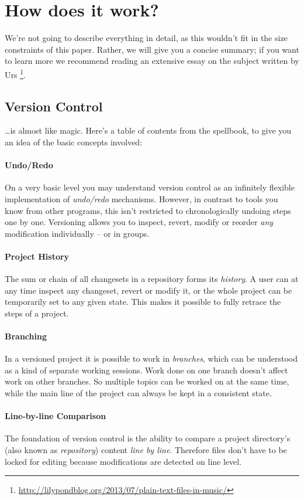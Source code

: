 \documentclass[11pt,a4paper]{article}
\begin{document}
\section{How does it work?}
We're not going to describe everything in detail, as this wouldn't fit in the size
constraints of this paper.  Rather, we will give you a concise summary; if you want
to learn more we recommend reading an extensive essay on the subject written by Urs%
\footnote{\url{http://lilypondblog.org/2013/07/plain-text-files-in-music/}}.

\subsection{Version Control}
\ldots is almost like magic.  Here's a table of contents from the spellbook,
to give you an idea of the basic concepts involved:

\paragraph{Undo/Redo}
On a very basic level you may understand version control as an infinitely flexible
implementation of \emph{undo/redo} mechanisms. However, in contrast to tools you
know from other programs, this isn't restricted to chronologically undoing steps one by
one. Versioning allows you to inspect, revert, modify or reorder \emph{any} modification
individually -- or in groups.

\paragraph{Project History}
The sum or chain of all changesets in a repository forms its \emph{history}. A user can 
at any time inspect any changeset, revert or modify it, or the whole project can be
temporarily set to any given state. This makes it possible to fully retrace the steps
of a project.

\paragraph{Branching}
In a versioned project it is possible to work in \emph{branches}, which can be
understood as a kind of separate working sessions. Work done on one branch doesn't affect
work on other branches. So multiple topics can be worked on at the same time, while
the main line of the project can always be kept in a consistent state.

\paragraph{Line-by-line Comparison}
The foundation of version control is the ability to compare a project directory's (also
known as \emph{repository}) content \emph{line by line}. Therefore files don't have to be locked for editing because modifications are detected on line level.
\end{document}

